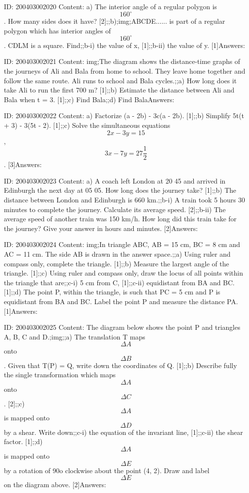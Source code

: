 \documentclass{article}
\begin{document}
ID: 200403002020
Content:
a) The interior angle of a regular polygon is $$160^{\circ}$$. How many sides does it have? [2];;b);img;ABCDE...... is part of a regular polygon which has interior angles of $$160^{\circ}$$. CDLM is a square. Find;;b-i) the value of x, [1];;b-ii) the value of y. [1]Answers:

ID: 200403002021
Content:
img;The diagram shows the distance-time graphs of the journeys of Ali and Bala from home to school. They leave home together and follow the same route. Ali runs to school and Bala cycles.;;a) How long does it take Ali to run the first 700 m? [1];;b) Estimate the distance between Ali and Bala when t = 3. [1];;c) Find Bala;;d) Find BalaAnswers:

ID: 200403002022
Content:
a) Factorize (a - 2b) - 3c(a - 2b). [1];;b) Simplify 5t(t + 3) - 3(5t - 2). [1];;c) Solve the simultaneous equations $$2x - 3y = 15$$, $$3x-7y=27\frac{1}{2}$$. [3]Answers:

ID: 200403002023
Content:
a) A coach left London at 20 45 and arrived in Edinburgh the next day at 05 05. How long does the journey take? [1];;b) The distance between London and Edinburgh is 660 km.;;b-i) A train took 5 hours 30 minutes to complete the journey. Calculate its average speed. [2];;b-ii) The average speed of another train was 150 km/h. How long did this train take for the journey? Give your answer in hours and minutes. [2]Answers:

ID: 200403002024
Content:
img;In triangle ABC, AB = 15 cm, BC = 8 cm and AC = 11 cm. The side AB is drawn in the answer space.;;a) Using ruler and compass only, complete the triangle. [1];;b) Measure the largest angle of the triangle. [1];;c) Using ruler and compass only, draw the locus of all points within the triangle that are;;c-i) 5 cm from C, [1];;c-ii) equidistant from BA and BC. [1];;d) The point P, within the triangle, is such that PC = 5 cm and P is equidistant from BA and BC. Label the point P and measure the distance PA. [1]Answers:

ID: 200403002025
Content:
The diagram below shows the point P and triangles A, B, C and D.;img;;a) The translation T maps $$\Delta  A$$ onto $$\Delta  B$$. Given that T(P) = Q, write down the coordinates of Q. [1];;b) Describe fully the single transformation which maps $$\Delta  A$$ onto $$\Delta  C$$. [2];;c) $$\Delta  A$$ is mapped onto $$\Delta  D$$ by a shear. Write down;;c-i) the equation of the invariant line, [1];;c-ii) the shear factor. [1];;d) $$\Delta  A$$ is mapped onto $$\Delta  E$$ by a rotation of 90o clockwise about the point (4, 2). Draw and label $$\Delta  E$$on the diagram above. [2]Answers:
\end{document}
